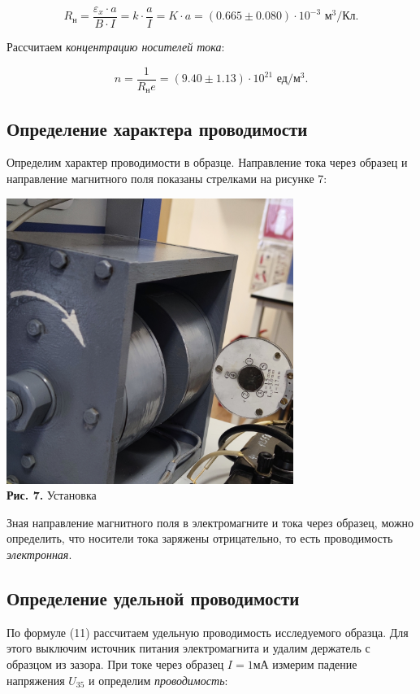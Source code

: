 \documentclass[a4paper,12pt]{article} %
\begin{document}
$$
R_\text{н} = \frac{\varepsilon_{x} \cdot a}{B \cdot I} = k \cdot \frac{a}{I} = K \cdot a = (0.665 \pm 0.080) \cdot 10^{-3}  \text{ м}^{3}/\text{Кл}.
$$

\hfill \break Рассчитаем \textit{концентрацию носителей тока}:

$$
n = \frac{1}{R_\text{н}e} = (9.40 \pm 1.13)\cdot 10^{21}\text{ ед}/\text{м}^3.
$$

\subsection{Определение характера проводимости}
\hfill \break Определим характер проводимости в образце. Направление тока через образец и направление магнитного поля показаны стрелками на рисунке 7:

\begin{center}
\includegraphics[width=0.7\textwidth]{3.3.4_7.jpg}\\
\textbf{Рис. 7.} Установка~\\
\end{center}

\hfill \break Зная направление магнитного поля в электромагните и тока через образец, можно определить, что носители тока заряжены отрицательно, то есть проводимость \textit{электронная}.

\subsection{Определение удельной проводимости}
\hfill \break По формуле (11) рассчитаем удельную проводимость исследуемого образца. Для этого выключим источник питания электромагнита и удалим держатель с образцом из зазора. При токе через образец $I = 1$мА измерим падение напряжения $U_{35}$ и определим \textit{проводимость}:
\end{document}
